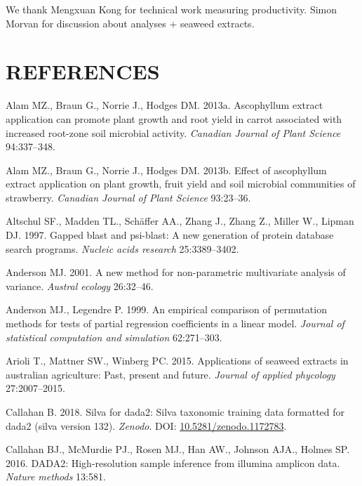 \documentclass[11pt,]{article}
\begin{document}
We thank Mengxuan Kong for technical work measuring productivity. Simon
Morvan for discussion about analyses + seaweed extracts.

\newpage  

\section*{REFERENCES}\label{references}

\hypertarget{refs}{}
\hypertarget{ref-alam2013ascophyllum}{}
Alam MZ., Braun G., Norrie J., Hodges DM. 2013a. Ascophyllum extract
application can promote plant growth and root yield in carrot associated
with increased root-zone soil microbial activity. \emph{Canadian Journal
of Plant Science} 94:337--348.

\hypertarget{ref-alam2013effect}{}
Alam MZ., Braun G., Norrie J., Hodges DM. 2013b. Effect of ascophyllum
extract application on plant growth, fruit yield and soil microbial
communities of strawberry. \emph{Canadian Journal of Plant Science}
93:23--36.

\hypertarget{ref-altschul1997gapped}{}
Altschul SF., Madden TL., Schäffer AA., Zhang J., Zhang Z., Miller W.,
Lipman DJ. 1997. Gapped blast and psi-blast: A new generation of protein
database search programs. \emph{Nucleic acids research} 25:3389--3402.

\hypertarget{ref-anderson2001new}{}
Anderson MJ. 2001. A new method for non-parametric multivariate analysis
of variance. \emph{Austral ecology} 26:32--46.

\hypertarget{ref-anderson1999empirical}{}
Anderson MJ., Legendre P. 1999. An empirical comparison of permutation
methods for tests of partial regression coefficients in a linear model.
\emph{Journal of statistical computation and simulation} 62:271--303.

\hypertarget{ref-arioli2015applications}{}
Arioli T., Mattner SW., Winberg PC. 2015. Applications of seaweed
extracts in australian agriculture: Past, present and future.
\emph{Journal of applied phycology} 27:2007--2015.

\hypertarget{ref-silva}{}
Callahan B. 2018. Silva for dada2: Silva taxonomic training data
formatted for dada2 (silva version 132). \emph{Zenodo}. DOI:
\href{https://doi.org/10.5281/zenodo.1172783}{10.5281/zenodo.1172783}.

\hypertarget{ref-callahan2016dada2}{}
Callahan BJ., McMurdie PJ., Rosen MJ., Han AW., Johnson AJA., Holmes SP.
2016. DADA2: High-resolution sample inference from illumina amplicon
data. \emph{Nature methods} 13:581.
\end{document}
